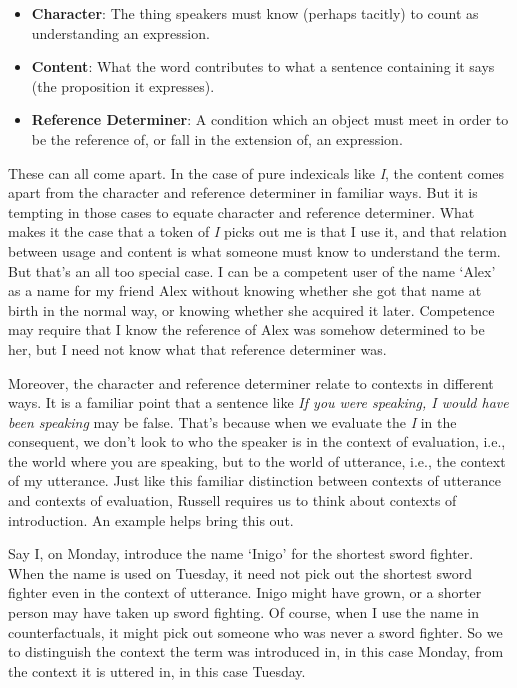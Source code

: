 \begin{itemize}
\item \textbf{Character}: The thing speakers must know (perhaps tacitly) to count as understanding an expression.

\item \textbf{Content}: What the word contributes to what a sentence containing it says (the proposition it expresses).

\item \textbf{Reference Determiner}: A condition which an object must meet in order to be the reference of, or fall in the extension of, an expression.

\end{itemize}
These can all come apart. In the case of pure indexicals like \emph{I}, the content comes apart from the character and reference determiner in familiar ways. But it is tempting in those cases to equate character and reference determiner. What makes it the case that a token of \emph{I} picks out me is that I use it, and that relation between usage and content is what someone must know to understand the term. But that's an all too special case. I can be a competent user of the name `Alex' as a name for my friend Alex without knowing whether she got that name at birth in the normal way, or knowing whether she acquired it later. Competence may require that I know the reference of Alex was somehow determined to be her, but I need not know what that reference determiner was.

Moreover, the character and reference determiner relate to contexts in different ways. It is a familiar point that a sentence like \emph{If you were speaking, I would have been speaking} may be false. That's because when we evaluate the \emph{I} in the consequent, we don't look to who the speaker is in the context of evaluation, i.e., the world where you are speaking, but to the world of utterance, i.e., the context of my utterance. Just like this familiar distinction between contexts of utterance and contexts of evaluation, Russell requires us to think about contexts of introduction. An example helps bring this out.

Say I, on Monday, introduce the name `Inigo' for the shortest sword fighter. When the name is used on Tuesday, it need not pick out the shortest sword fighter even in the context of utterance. Inigo might have grown, or a shorter person may have taken up sword fighting. Of course, when I use the name in counterfactuals, it might pick out someone who was never a sword fighter. So we to distinguish the context the term was introduced in, in this case Monday, from the context it is uttered in, in this case Tuesday. 

